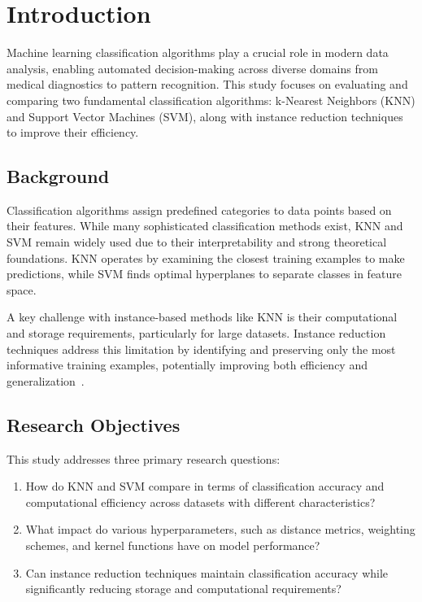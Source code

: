 \section{Introduction}
\label{sec:introduction}

Machine learning classification algorithms play a crucial role in modern data analysis, enabling automated decision-making across diverse domains from medical diagnostics to pattern recognition. This study focuses on evaluating and comparing two fundamental classification algorithms: k-Nearest Neighbors (KNN) and Support Vector Machines (SVM), along with instance reduction techniques to improve their efficiency.

\subsection{Background}

Classification algorithms assign predefined categories to data points based on their features. While many sophisticated classification methods exist, KNN and SVM remain widely used due to their interpretability and strong theoretical foundations. KNN operates by examining the closest training examples to make predictions, while SVM finds optimal hyperplanes to separate classes in feature space.

A key challenge with instance-based methods like KNN is their computational and storage requirements, 
particularly for large datasets. Instance reduction techniques address this limitation by identifying 
and preserving only the most informative training examples, potentially improving both efficiency 
and generalization~\cite{knn}.

\subsection{Research Objectives}

This study addresses three primary research questions:

\begin{enumerate}
    \item How do KNN and SVM compare in terms of classification accuracy and computational efficiency across datasets with different characteristics?
    \item What impact do various hyperparameters, such as distance metrics, weighting schemes, and kernel functions have on model performance?
    \item Can instance reduction techniques maintain classification accuracy while significantly reducing storage and computational requirements?
\end{enumerate}

